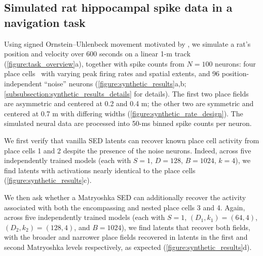 \subsection{Simulated rat hippocampal spike data in a navigation task}
\label{subsection:synthetic_results}

Using signed Ornstein--Uhlenbeck movement motivated by \citet{theodoni_2018_theta_ou}, we simulate a rat's position and velocity over 600 seconds on a linear 1-m track (\autoref{figure:task_overview}a), together with spike counts from $N=100$ neurons: four place cells~\citep{okeefe_dostrovsky_1971_place_cells} with varying peak firing rates and spatial extents, and 96 position-independent ``noise'' neurons (\autoref{figure:synthetic_results}a,b; \hyperref[subsubsection:synthetic_results_details]{\ref*{subsubsection:synthetic_results_details}} for details). The first two place fields are asymmetric and centered at 0.2 and 0.4 m; the other two are symmetric and centered at 0.7 m with differing widths (\autoref{figure:synthetic_rate_design}). The simulated neural data are processed into 50-ms binned spike counts per neuron.

We first verify that vanilla SED latents can recover known place cell activity from place cells 1 and 2 despite the presence of the noise neurons. Indeed, across five independently trained models (each with $S=1$, $D=128$, $B=1024$, $k=4$), we find latents with activations nearly identical to the place cells (\autoref{figure:synthetic_results}c).

We then ask whether a Matryoshka SED can additionally recover the activity associated with both the encompassing and nested place cells 3 and 4. Again, across five independently trained models (each with $S=1$, $(D_1,k_1)=(64,4)$, $(D_2,k_2)=(128,4)$, and $B=1024$), we find latents that recover both fields, with the broader and narrower place fields recovered in latents in the first and second Matryoshka levels respectively, as expected (\autoref{figure:synthetic_results}d).


